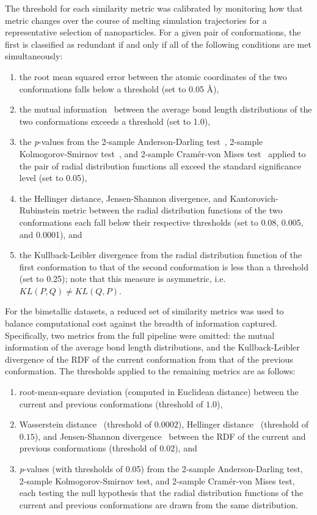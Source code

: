 \documentclass[12pt]{article}
\begin{document}
The threshold for each similarity metric was calibrated by monitoring how that metric changes over the course of melting simulation trajectories for a representative selection of nanoparticles. For a given pair of conformations, the first is classified as redundant if and only if all of the following conditions are met simultaneously:
\begin{enumerate}
    \item the root mean squared error between the atomic coordinates of the two conformations falls below a threshold (set to 0.05 \AA),
    \item the mutual information~\cite{Kreer1957MI,Shannon1948MI} between the average bond length distributions of the two conformations exceeds a threshold (set to 1.0),
    \item the \textit{p}-values from the 2-sample Anderson-Darling test~\cite{Scholz2012ADtest}, 2-sample Kolmogorov-Smirnov test~\cite{Conover1965KStest}, and 2-sample Cram\'er-von Mises test~\cite{Anderson1962CMtest} applied to the pair of radial distribution functions all exceed the standard significance level (set to 0.05),
    \item the Hellinger distance, Jensen-Shannon divergence, and Kantorovich-Rubinstein metric between the radial distribution functions of the two conformations each fall below their respective thresholds (set to 0.08, 0.005, and 0.0001), and
    \item the Kullback-Leibler divergence from the radial distribution function of the first conformation to that of the second conformation is less than a threshold (set to 0.25); note that this measure is asymmetric, i.e.\ $KL(P, Q) \neq KL(Q, P)$.
\end{enumerate}

For the bimetallic datasets, a reduced set of similarity metrics was used to balance computational cost against the breadth of information captured. Specifically, two metrics from the full pipeline were omitted: the mutual information of the average bond length distributions, and the Kullback-Leibler divergence of the RDF of the current conformation from that of the previous conformation. The thresholds applied to the remaining metrics are as follows:
\begin{enumerate}
    \item root-mean-square deviation (computed in Euclidean distance) between the current and previous conformations (threshold of $1.0$),
    \item Wasserstein distance~\cite{Kantorovich1960KantorovichDist} (threshold of $0.0002$), Hellinger distance~\cite{Beran1977HellingerDist} (threshold of $0.15$), and Jensen-Shannon divergence~\cite{Fuglede2004JSdiv} between the RDF of the current and previous conformations (threshold of $0.02$), and
    \item \textit{p}-values (with thresholds of 0.05) from the 2-sample Anderson-Darling test, 2-sample Kolmogorov-Smirnov test, and 2-sample Cram\'er-von Mises test, each testing the null hypothesis that the radial distribution functions of the current and previous conformations are drawn from the same distribution.
\end{enumerate}
\end{document}
